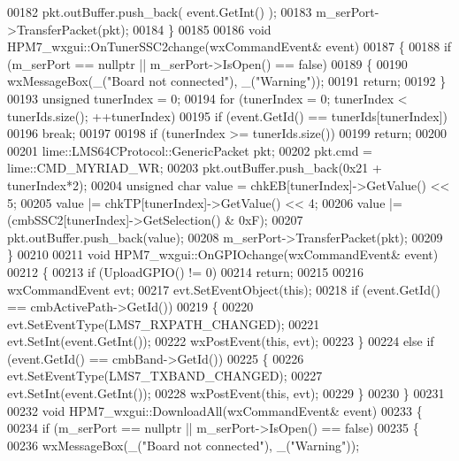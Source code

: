 \begin{DoxyCode}
{{{00182     pkt.outBuffer.push\_back( event.GetInt() );
00183     m_serPort->TransferPacket(pkt);
00184 \}
00185 
00186 \textcolor{keywordtype}{void} HPM7_wxgui::OnTunerSSC2change(wxCommandEvent& event)
00187 \{
00188     \textcolor{keywordflow}{if} (m_serPort == \textcolor{keyword}{nullptr} || m_serPort->IsOpen() == \textcolor{keyword}{false})
00189     \{
00190         wxMessageBox(\_(\textcolor{stringliteral}{"Board not connected"}), \_(\textcolor{stringliteral}{"Warning"}));
00191         \textcolor{keywordflow}{return};
00192     \}
00193     \textcolor{keywordtype}{unsigned} tunerIndex = 0;
00194     \textcolor{keywordflow}{for} (tunerIndex = 0; tunerIndex < tunerIds.size(); ++tunerIndex)
00195         \textcolor{keywordflow}{if} (event.GetId() == tunerIds[tunerIndex])
00196             \textcolor{keywordflow}{break};
00197 
00198     \textcolor{keywordflow}{if} (tunerIndex >= tunerIds.size())
00199         \textcolor{keywordflow}{return};
00200 
00201     lime::LMS64CProtocol::GenericPacket pkt;
00202     pkt.cmd = lime::CMD_MYRIAD_WR;
00203     pkt.outBuffer.push\_back(0x21 + tunerIndex*2);
00204     \textcolor{keywordtype}{unsigned} \textcolor{keywordtype}{char} value = chkEB[tunerIndex]->GetValue() << 5;
00205     value |= chkTP[tunerIndex]->GetValue() << 4;
00206     value |= (cmbSSC2[tunerIndex]->GetSelection() & 0xF);
00207     pkt.outBuffer.push\_back(value);
00208     m_serPort->TransferPacket(pkt);
00209 \}
00210 
00211 \textcolor{keywordtype}{void} HPM7_wxgui::OnGPIOchange(wxCommandEvent& event)
00212 \{
00213     \textcolor{keywordflow}{if} (UploadGPIO() != 0)
00214         \textcolor{keywordflow}{return};
00215 
00216     wxCommandEvent evt;
00217     evt.SetEventObject(\textcolor{keyword}{this});
00218     \textcolor{keywordflow}{if} (event.GetId() == cmbActivePath->GetId())
00219     \{
00220         evt.SetEventType(LMS7\_RXPATH\_CHANGED);
00221         evt.SetInt(event.GetInt());
00222         wxPostEvent(\textcolor{keyword}{this}, evt);
00223     \}
00224     \textcolor{keywordflow}{else} \textcolor{keywordflow}{if} (event.GetId() == cmbBand->GetId())
00225     \{
00226         evt.SetEventType(LMS7\_TXBAND\_CHANGED);
00227         evt.SetInt(event.GetInt());
00228         wxPostEvent(\textcolor{keyword}{this}, evt);
00229     \}
00230 \}
00231 
00232 \textcolor{keywordtype}{void} HPM7_wxgui::DownloadAll(wxCommandEvent& event)
00233 \{
00234     \textcolor{keywordflow}{if} (m_serPort == \textcolor{keyword}{nullptr} || m_serPort->IsOpen() == \textcolor{keyword}{false})
00235     \{
00236         wxMessageBox(\_(\textcolor{stringliteral}{"Board not connected"}), \_(\textcolor{stringliteral}{"Warning"}));
}}}
\end{DoxyCode}
